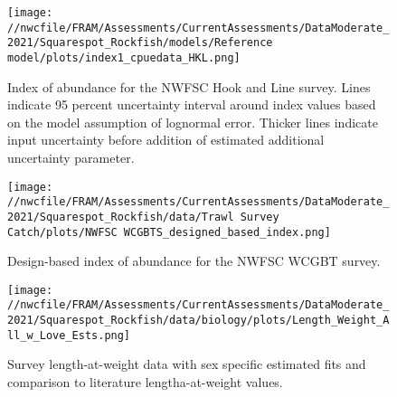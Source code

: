 \documentclass[11pt,
  english,
  a4paper,
]{article}
\begin{document}
\tagmcend\tagstructend


\begin{figure}
\centering
\texttt{[image: //nwcfile/FRAM/Assessments/CurrentAssessments/DataModerate\_2021/Squarespot\_Rockfish/models/Reference model/plots/index1\_cpuedata\_HKL.png]}
\caption{Index of abundance for the NWFSC Hook and Line survey. Lines indicate 95 percent uncertainty interval around index values based on the model assumption of lognormal error. Thicker lines indicate input uncertainty before addition of estimated additional uncertainty parameter.\label{fig:hkl-index}}
\end{figure}

\tagmcend\tagstructend


\begin{figure}
\centering
\texttt{[image: //nwcfile/FRAM/Assessments/CurrentAssessments/DataModerate\_2021/Squarespot\_Rockfish/data/Trawl Survey Catch/plots/NWFSC WCGBTS\_designed\_based\_index.png]}
\caption{Design-based index of abundance for the NWFSC WCGBT survey.\label{fig:wcgbts-dbindex}}
\end{figure}

\tagmcend\tagstructend


\begin{figure}
\centering
\texttt{[image: //nwcfile/FRAM/Assessments/CurrentAssessments/DataModerate\_2021/Squarespot\_Rockfish/data/biology/plots/Length\_Weight\_All\_w\_Love\_Ests.png]}
\caption{Survey length-at-weight data with sex specific estimated fits and comparison to literature lengtha-at-weight values.\label{fig:len-weight}}
\end{figure}

\tagmcend\tagstructend
\end{document}
